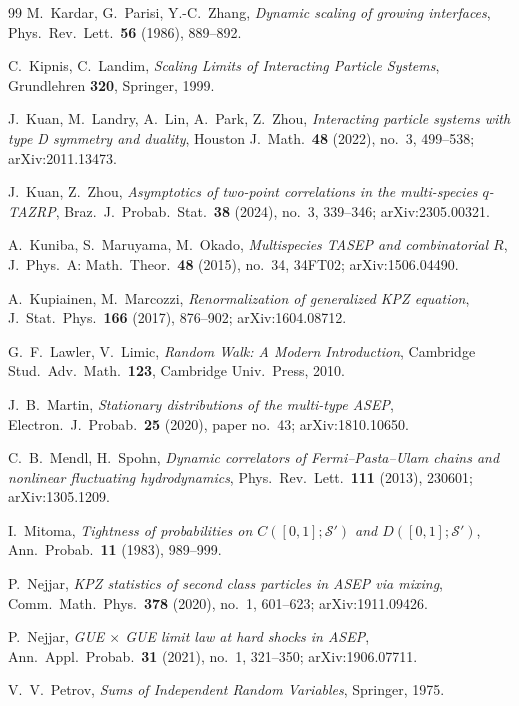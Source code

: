 \documentclass[11pt]{article}
\theoremstyle{plain}
\theoremstyle{definition}
\theoremstyle{remark}
\begin{document}
\begin{thebibliography}{99}
 M.~Kardar, G.~Parisi, Y.-C.~Zhang, \emph{Dynamic scaling of growing
interfaces}, Phys.~Rev.~Lett.~\textbf{56} (1986), 889--892.

 C.~Kipnis, C.~Landim, \emph{Scaling Limits of Interacting Particle Systems},
Grundlehren \textbf{320}, Springer, 1999.

 J.~Kuan, M.~Landry, A.~Lin, A.~Park, Z.~Zhou, \emph{Interacting particle
systems with type D symmetry and duality}, Houston J.~Math.~\textbf{48} (2022), no.~3,
499--538; arXiv:2011.13473.

 J.~Kuan, Z.~Zhou, \emph{Asymptotics of two-point correlations in
the multi-species $q$-TAZRP}, Braz.~J.~Probab.~Stat.~\textbf{38} (2024), no.~3,
339--346; arXiv:2305.00321.

 A.~Kuniba, S.~Maruyama, M.~Okado, \emph{Multispecies TASEP and
combinatorial $R$}, J.~Phys.~A: Math.~Theor.~\textbf{48} (2015), no.~34, 34FT02;
arXiv:1506.04490.

 A.~Kupiainen, M.~Marcozzi, \emph{Renormalization of
generalized KPZ equation}, J.~Stat.~Phys.~\textbf{166} (2017), 876--902;
arXiv:1604.08712.

 G.~F.~Lawler, V.~Limic, \emph{Random Walk: A Modern Introduction},
Cambridge Stud.~Adv.~Math.~\textbf{123}, Cambridge Univ.~Press, 2010.

 J.~B.~Martin, \emph{Stationary distributions of the multi-type
ASEP}, Electron.~J.~Probab.~\textbf{25} (2020), paper no.~43; arXiv:1810.10650.

 C.~B.~Mendl, H.~Spohn, \emph{Dynamic correlators of
Fermi--Pasta--Ulam chains and nonlinear fluctuating hydrodynamics},
Phys.~Rev.~Lett.~\textbf{111} (2013), 230601; arXiv:1305.1209.

 I.~Mitoma, \emph{Tightness of probabilities on
$C([0,1];\mathcal S')$ and $D([0,1];\mathcal S')$}, Ann.~Probab.~\textbf{11} (1983),
989--999.

 P.~Nejjar, \emph{KPZ statistics of second class particles in
ASEP via mixing}, Comm.~Math.~Phys.~\textbf{378} (2020), no.~1, 601--623;
arXiv:1911.09426.

 P.~Nejjar, \emph{GUE $\times$ GUE limit law at hard shocks in
ASEP}, Ann.~Appl.~Probab.~\textbf{31} (2021), no.~1, 321--350; arXiv:1906.07711.

 V.~V.~Petrov, \emph{Sums of Independent Random Variables}, Springer, 1975.


\end{thebibliography}
\end{document}
